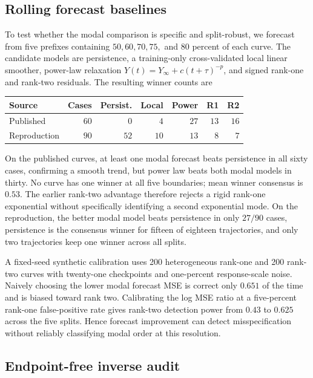 \documentclass[10pt,twocolumn]{article}
\begin{document}
\subsection{Rolling forecast baselines}

To test whether the modal comparison is specific and split-robust, we forecast
from five prefixes containing $50,60,70,75,$ and $80$ percent of each curve.
The candidate models are persistence, a training-only cross-validated local
linear smoother, power-law relaxation
$Y(t)=Y_\infty+c(t+\tau)^{-p}$, and signed rank-one and rank-two residuals.
The resulting winner counts are
\begin{center}
\small
\setlength{\tabcolsep}{4pt}
\begin{tabular}{lrrrrrr}
\hline
Source & Cases & Persist. & Local & Power & R1 & R2\\
\hline
Published    & $60$ & $0$  & $4$  & $27$ & $13$ & $16$\\
Reproduction & $90$ & $52$ & $10$ & $13$ & $8$  & $7$\\
\hline
\end{tabular}
\end{center}
On the published curves, at least one modal forecast beats persistence in all
sixty cases, confirming a smooth trend, but power law beats both modal models
in thirty.  No curve has one winner at all five boundaries; mean winner
consensus is $0.53$.  The earlier rank-two advantage therefore rejects a rigid
rank-one exponential without specifically identifying a second exponential
mode.  On the reproduction, the better modal model beats persistence in only
$27/90$ cases, persistence is the consensus winner for fifteen of eighteen
trajectories, and only two trajectories keep one winner across all splits.

A fixed-seed synthetic calibration uses 200 heterogeneous rank-one and 200
rank-two curves with twenty-one checkpoints and one-percent response-scale
noise.  Naively choosing the lower modal forecast MSE is correct only $0.651$
of the time and is biased toward rank two.  Calibrating the log MSE ratio at a
five-percent rank-one false-positive rate gives rank-two detection power from
$0.43$ to $0.625$ across the five splits.  Hence forecast improvement can
detect misspecification without reliably classifying modal order at this
resolution.

\subsection{Endpoint-free inverse audit}
\end{document}
